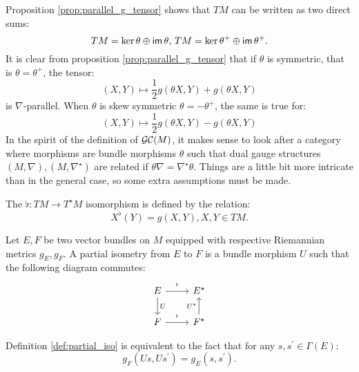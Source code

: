 Proposition  \ref{prop:parallel_g_tensor} shows that $TM$ can be written as two direct sums:
\begin{equation}
    \label{eq:split_tm}
    TM = \ker \theta \oplus \operatorname{\textsf{im}} \theta , \, TM = \ker \theta^+ \oplus \operatorname{\textsf{im}} \theta^+.
\end{equation}
It is clear from proposition \ref{prop:parallel_g_tensor} that if $\theta$ is symmetric, that is $\theta = \theta^+$, the tensor:
\begin{equation}
(X,Y) \mapsto \frac{1}{2} g\left( \theta X, Y\right) + g\left( \theta X, Y\right)
\end{equation}
is $\nabla$-parallel.
When $\theta$ is skew symmetric $\theta = -\theta^+$, the same is true for:
\begin{equation}
(X,Y) \mapsto \frac{1}{2} g\left( \theta X, Y\right) - g\left( \theta X, Y\right)
\end{equation}
In the spirit of the definition of $\mathcal{GC}(M)$, it makes sense to look after a category where morphisms are bundle morphisms $\theta$ such that dual gauge structures $(M,\nabla), (M, \nabla^\star)$ are related if $\theta \nabla = \nabla^\star \theta.$ Things are a little bit more intricate than in the general case, so some extra assumptions must be made.
\begin{defn}
    \label{def:flat_morphism}
    The $\flat \colon TM \to T^\star M$ isomorphism is defined by the relation:
    \begin{equation}
        \label{eq:flat_morphism}
        X^\flat(Y) = g(X, Y), X, Y \in TM.
    \end{equation}
\end{defn}
\begin{defn}
\label{def:partial_iso}
Let $E,F$ be two vector bundles on $M$ equipped with respective Riemannian metrics $g_E,g_F.$ A partial isometry from $E$ to $F$ is a bundle morphism $U$ such that the following diagram commutes:
\begin{equation}
    \label{eq:partial_iso}
    \begin{tikzcd}
        E \ar[r,"{}^\flat"] \ar[d,"U"] & E^\star \\
        F \ar[r,"{}^\flat"] & F^\star \ar[u,"U^\star"]
    \end{tikzcd}
\end{equation}
\end{defn}
\begin{rem}
    Definition \ref{def:partial_iso} is equivalent to the fact that for any $s,s^\prime \in \Gamma(E)$:
    \[
    g_F\left(Us, Us^\prime\right) = g_E\left(s,s^\prime\right).
    \]
\end{rem}

